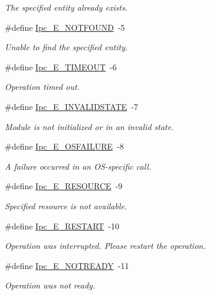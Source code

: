 \begin{DoxyCompactItemize}
\begin{DoxyCompactList}\small\item\em The specified entity already exists. \end{DoxyCompactList}\item 
\#define \hyperlink{_ipc_8h_ab511d4936c15fb4ad724a6c457af45a2}{Ipc\-\_\-\-E\-\_\-\-N\-O\-T\-F\-O\-U\-N\-D}~-\/5
\begin{DoxyCompactList}\small\item\em Unable to find the specified entity. \end{DoxyCompactList}\item 
\#define \hyperlink{_ipc_8h_a5ec546ed4e07fc5d8215ebdf8fee65d0}{Ipc\-\_\-\-E\-\_\-\-T\-I\-M\-E\-O\-U\-T}~-\/6
\begin{DoxyCompactList}\small\item\em Operation timed out. \end{DoxyCompactList}\item 
\#define \hyperlink{_ipc_8h_acebc3658919077d62e56e7e88247fa22}{Ipc\-\_\-\-E\-\_\-\-I\-N\-V\-A\-L\-I\-D\-S\-T\-A\-T\-E}~-\/7
\begin{DoxyCompactList}\small\item\em Module is not initialized or in an invalid state. \end{DoxyCompactList}\item 
\#define \hyperlink{_ipc_8h_ae747ac1c4d39501d31ed73c09db1fd30}{Ipc\-\_\-\-E\-\_\-\-O\-S\-F\-A\-I\-L\-U\-R\-E}~-\/8
\begin{DoxyCompactList}\small\item\em A failure occurred in an O\-S-\/specific call. \end{DoxyCompactList}\item 
\#define \hyperlink{_ipc_8h_a80f32a1da0accc7f1636b7e875cb731a}{Ipc\-\_\-\-E\-\_\-\-R\-E\-S\-O\-U\-R\-C\-E}~-\/9
\begin{DoxyCompactList}\small\item\em Specified resource is not available. \end{DoxyCompactList}\item 
\#define \hyperlink{_ipc_8h_acaf8edc10dc7b47670564739d63f6657}{Ipc\-\_\-\-E\-\_\-\-R\-E\-S\-T\-A\-R\-T}~-\/10
\begin{DoxyCompactList}\small\item\em Operation was interrupted. Please restart the operation. \end{DoxyCompactList}\item 
\#define \hyperlink{_ipc_8h_af61be5fb093e7cd7cb076afc8b2fe798}{Ipc\-\_\-\-E\-\_\-\-N\-O\-T\-R\-E\-A\-D\-Y}~-\/11
\begin{DoxyCompactList}\small\item\em Operation was not ready. \end{DoxyCompactList}\end{DoxyCompactItemize}
